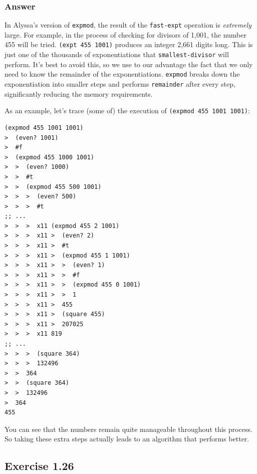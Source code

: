 \documentclass[final,fleqn,titlepage,twoside]{article}
\begin{document}
\subsubsection{Answer}
\label{sec:org3aa4819}
In Alyssa's version of \texttt{expmod}, the result of the
\texttt{fast-expt} operation is \emph{extremely} large. For example, in the
process of checking for divisors of 1,001, the number 455 will be tried.
\texttt{(expt 455 1001)} produces an integer 2,661 digits long. This is just
one of the thousands of exponentiations that \texttt{smallest-divisor} will
perform. It's best to avoid this, so we use to our advantage the fact that we
only need to know the remainder of the exponentiations. \texttt{expmod}
breaks down the exponentiation into smaller steps and performs
\texttt{remainder} after every step, significantly reducing the memory
requirements.

As an example, let's trace (some of) the execution of \texttt{(expmod 455 1001 1001)}:

\begin{verbatim}
(expmod 455 1001 1001)
>  (even? 1001)
>  #f
>  (expmod 455 1000 1001)
>  >  (even? 1000)
>  >  #t
>  >  (expmod 455 500 1001)
>  >  >  (even? 500)
>  >  >  #t
;; ...
>  >  >  x11 (expmod 455 2 1001)
>  >  >  x11 >  (even? 2)
>  >  >  x11 >  #t
>  >  >  x11 >  (expmod 455 1 1001)
>  >  >  x11 >  >  (even? 1)
>  >  >  x11 >  >  #f
>  >  >  x11 >  >  (expmod 455 0 1001)
>  >  >  x11 >  >  1
>  >  >  x11 >  455
>  >  >  x11 >  (square 455)
>  >  >  x11 >  207025
>  >  >  x11 819
;; ...
>  >  >  (square 364)
>  >  >  132496
>  >  364
>  >  (square 364)
>  >  132496
>  364
455
\end{verbatim}

You can see that the numbers remain quite manageable throughout this process. So
taking these extra steps actually leads to an algorithm that performs better.

\subsection{Exercise 1.26}
\label{sec:org78769f7}
\end{document}
